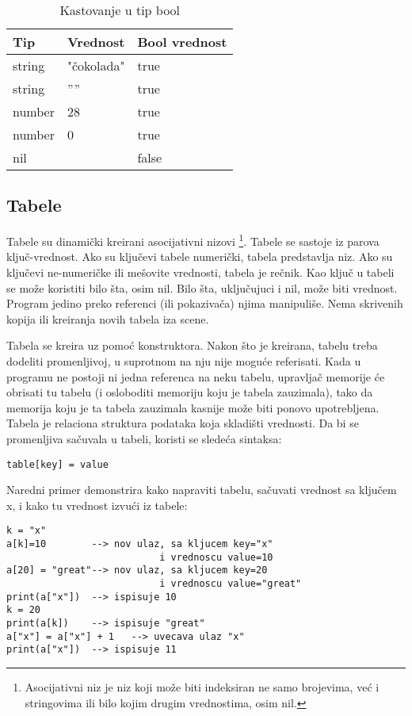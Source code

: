 \documentclass[a4paper]{article}
\begin{document}
\begin{table}[h!]
\begin{center}
\begin{tabular}{|l|l|l|}
\hline
Tip & Vrednost & Bool vrednost \\
\hline
string &  "čokolada" &  true \\
\hline
string  & '''' &  true \\
\hline
number &  28 &  true \\
\hline
number & 0 &  true \\
\hline
nil &   & false \\
\hline 
\end{tabular}
\caption{Kastovanje u tip bool}
\label{kastovanje}
\end{center}
\end{table}

\subsection{Tabele}
\label{sec:tabele}


Tabele su dinamički kreirani asocijativni nizovi \footnote{Asocijativni niz je niz koji može biti indeksiran ne samo brojevima, već i stringovima ili bilo kojim drugim vrednostima, osim nil.}. Tabele se sastoje iz parova ključ-vrednost. Ako su ključevi tabele numerički, tabela predstavlja niz. Ako su ključevi ne-numeričke ili mešovite vrednosti, tabela je rečnik. Kao ključ u tabeli se može koristiti bilo šta, osim nil. Bilo šta, uključujuci i nil, može biti vrednost.
Program jedino preko referenci (ili pokazivača) njima manipuliše. Nema skrivenih kopija ili kreiranja novih tabela iza scene.

Tabela se kreira uz pomoć konstruktora. Nakon što je kreirana, tabelu treba dodeliti promenljivoj, u suprotnom na nju nije moguće referisati. Kada u programu ne postoji ni jedna referenca na neku tabelu, upravljač memorije će obrisati tu tabelu (i osloboditi memoriju koju je tabela zauzimala), tako da memorija koju je ta tabela zauzimala kasnije može biti ponovo upotrebljena. Tabela je relaciona struktura podataka koja skladišti vrednosti. Da bi se promenljiva sačuvala u tabeli, koristi se sledeća sintaksa:
\begin{verbatim}
table[key] = value
\end{verbatim}
Naredni primer demonstrira kako napraviti tabelu, sačuvati vrednost sa ključem x, i kako tu vrednost izvući iz tabele: %
\begin{lstlisting}[caption={Primer čuvanja vrednosti u tabeli},frame=single, label=tabela1]
k = "x"
a[k]=10        --> nov ulaz, sa kljucem key="x" 
                           i vrednoscu value=10
a[20] = "great"--> nov ulaz, sa kljucem key=20 
                           i vrednoscu value="great"
print(a["x"])  --> ispisuje 10
k = 20
print(a[k])    --> ispisuje "great"
a["x"] = a["x"] + 1   --> uvecava ulaz "x"
print(a["x"])  --> ispisuje 11
\end{lstlisting}
\end{document}
